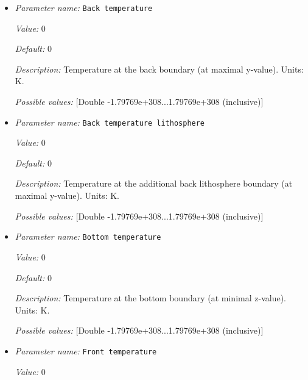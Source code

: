 \begin{itemize}
\item {\it Parameter name:} {\tt Back temperature}
\label{parameters:Boundary temperature model/Box with lithosphere boundary indicators/Back temperature}


{\it Value:} 0


{\it Default:} 0


{\it Description:} Temperature at the back boundary (at maximal y-value). Units: K.


{\it Possible values:} [Double -1.79769e+308...1.79769e+308 (inclusive)]
\item {\it Parameter name:} {\tt Back temperature lithosphere}
\label{parameters:Boundary temperature model/Box with lithosphere boundary indicators/Back temperature lithosphere}


{\it Value:} 0


{\it Default:} 0


{\it Description:} Temperature at the additional back lithosphere boundary (at maximal y-value). Units: K.


{\it Possible values:} [Double -1.79769e+308...1.79769e+308 (inclusive)]
\item {\it Parameter name:} {\tt Bottom temperature}
\label{parameters:Boundary temperature model/Box with lithosphere boundary indicators/Bottom temperature}


{\it Value:} 0


{\it Default:} 0


{\it Description:} Temperature at the bottom boundary (at minimal z-value). Units: K.


{\it Possible values:} [Double -1.79769e+308...1.79769e+308 (inclusive)]
\item {\it Parameter name:} {\tt Front temperature}
\label{parameters:Boundary temperature model/Box with lithosphere boundary indicators/Front temperature}


{\it Value:} 0



\end{itemize}
